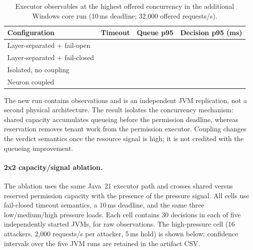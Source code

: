 \begin{table}[t]
\centering
\small
\caption{Executor observables at the highest offered concurrency in the
additional Windows core run (10\,ms deadline; 32,000 offered requests/s).}
\label{tab:ccpe-concurrency}
\begin{tabular}{lrrr}
\toprule
Configuration & Timeout & Queue p95 & Decision p95 (ms) \\
\midrule
Layer-separated + fail-open   & \CCPEwindowsccpecorehighFailOpenTimeout{} & \CCPEwindowsccpecorehighFailOpenQueuePninetyfive{} & \CCPEwindowsccpecorehighFailOpenLatencyPninetyfive{} \\
Layer-separated + fail-closed & \CCPEwindowsccpecorehighFailClosedTimeout{} & \CCPEwindowsccpecorehighFailClosedQueuePninetyfive{} & \CCPEwindowsccpecorehighFailClosedLatencyPninetyfive{} \\
Isolated, no coupling         & \CCPEwindowsccpecorehighIsolatedTimeout{} & \CCPEwindowsccpecorehighIsolatedQueuePninetyfive{} & \CCPEwindowsccpecorehighIsolatedLatencyPninetyfive{} \\
Neuron coupled                & \CCPEwindowsccpecorehighCoupledTimeout{} & \CCPEwindowsccpecorehighCoupledQueuePninetyfive{} & \CCPEwindowsccpecorehighCoupledLatencyPninetyfive{} \\
\bottomrule
\end{tabular}
\end{table}

The new run contains \CCPEAdditionalObservationCount{} observations and is an independent JVM
replication, not a second physical architecture. The result isolates the
concurrency mechanism: shared capacity accumulates queueing before the
permission deadline, whereas reservation removes tenant work from the
permission executor. Coupling changes the verdict semantics once the
resource signal is high; it is not credited with the queueing improvement.

\paragraph{2x2 capacity/signal ablation.}
The ablation uses the same Java~21 executor path and crosses shared versus
reserved permission capacity with the presence of the pressure signal. All
cells use fail-closed timeout semantics, a 10\,ms deadline, and the same three
low/medium/high pressure loads. Each cell contains 30 decisions in each of
five independently started JVMs, for \CCPEAblationObservationCount{} raw
observations. The high-pressure cell (16 attackers, 2,000 requests/s per
attacker, 5\,ms hold) is shown below; confidence intervals over the five JVM
runs are retained in the artifact CSV.

